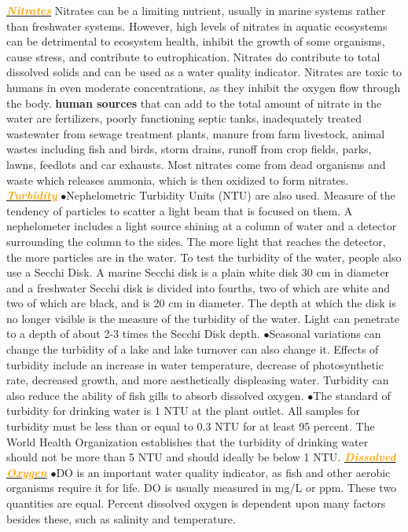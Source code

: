\documentclass{article}
\newcommand{\ddd}{$\bullet$}
\newcommand{\orange}[1]{\textcolor{orange}{#1}}
\newcommand{\mysubsection}[1]{\underline{\textbf{{\textit{\orange{#1}}}}}}
\begin{document}
\begin{multicols*}{4}
        \mysubsection{Nitrates}
           Nitrates can be a limiting nutrient, usually in marine systems rather than freshwater systems. However, high levels of nitrates in aquatic ecosystems can be detrimental to ecosystem health, inhibit the growth of some organisms, cause stress, and contribute to eutrophication. Nitrates do contribute to total dissolved solids and can be used as a water quality indicator. Nitrates are toxic to humans in even moderate concentrations, as they inhibit the oxygen flow through the body. \textbf{human sources} that can add to the total amount of nitrate in the water are fertilizers, poorly functioning septic tanks, inadequately treated wastewater from sewage treatment plants, manure from farm livestock, animal wastes including fish and birds, storm drains, runoff from crop fields, parks, lawns, feedlots and car exhausts. Most nitrates come from dead organisms and waste which releases ammonia, which is then oxidized to form nitrates.
        \mysubsection{Turbidity}
            \ddd Nephelometric Turbidity Units (NTU) are also used. Measure of the tendency of particles to scatter a light beam that is focused on them. A nephelometer includes a light source shining at a column of water and a detector surrounding the column to the sides. The more light that reaches the detector, the more particles are in the water. To test the turbidity of the water, people also use a Secchi Disk. A marine Secchi disk is a plain white disk 30 cm in diameter and a freshwater Secchi disk is divided into fourths, two of which are white and two of which are black, and is 20 cm in diameter. The depth at which the disk is no longer visible is the measure of the turbidity of the water. Light can penetrate to a depth of about 2-3 times the Secchi Disk depth. 
            \ddd Seasonal variations can change the turbidity of a lake and lake turnover can also change it. Effects of turbidity include an increase in water temperature, decrease of photosynthetic rate, decreased growth, and more aesthetically displeasing water. Turbidity can also reduce the ability of fish gills to absorb dissolved oxygen. 
            \ddd The standard of turbidity for drinking water is 1 NTU at the plant outlet. All samples for turbidity must be less than or equal to 0.3 NTU for at least 95 percent. The World Health Organization establishes that the turbidity of drinking water should not be more than 5 NTU and should ideally be below 1 NTU. 
        \mysubsection{Dissolved Oxygen}
            \ddd DO is an important water quality indicator, as fish and other aerobic organisms require it for life. DO is usually measured in mg/L or ppm. These two quantities are equal. Percent dissolved oxygen is dependent upon many factors besides these, such as salinity and temperature.

\end{multicols*}
\end{document}
